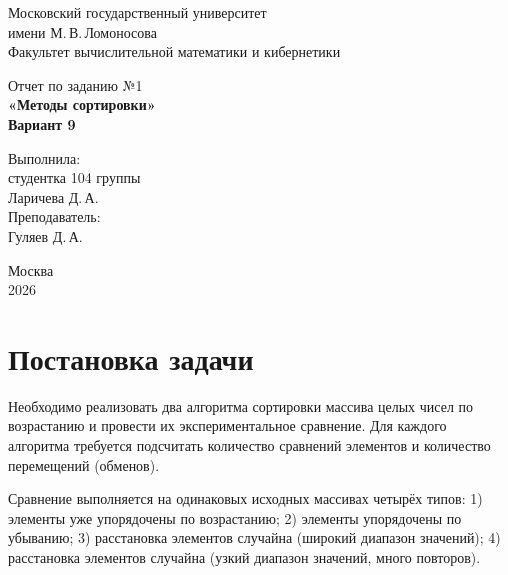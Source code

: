 \documentclass[a4paper,12pt]{article}
\begin{document}
\begin{titlepage}
\begin{center}
Московский государственный университет\\
имени М.\,В.\,Ломоносова\\
Факультет вычислительной математики и кибернетики
\end{center}

\vfill

\begin{center}
{\fontsize{18}{22}\selectfont Отчет по заданию №1}\\[6pt]
{\bfseries\fontsize{18}{22}\selectfont «Методы сортировки»}\\[10pt]
{\bfseries\fontsize{16}{20}\selectfont Вариант 9}
\end{center}

\vfill

\begin{flushright}
Выполнила:\\
студентка 104 группы\\
Ларичева Д.\,А.\\[14pt]
Преподаватель:\\
Гуляев Д.\,А.
\end{flushright}

\vfill

\begin{center}
Москва\\
2026
\end{center}
\end{titlepage}

\tableofcontents

\section{Постановка задачи}

Необходимо реализовать два алгоритма сортировки массива целых чисел по возрастанию и провести их экспериментальное сравнение. Для каждого алгоритма требуется подсчитать количество сравнений элементов и количество перемещений (обменов).

Сравнение выполняется на одинаковых исходных массивах четырёх типов:
1) элементы уже упорядочены по возрастанию;  
2) элементы упорядочены по убыванию;  
3) расстановка элементов случайна (широкий диапазон значений);  
4) расстановка элементов случайна (узкий диапазон значений, много повторов).
\end{document}
